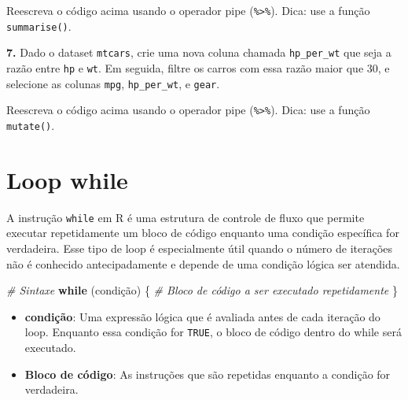 \documentclass[
]{book}
\newenvironment{Shaded}{\begin{snugshade}}{\end{snugshade}}
\newcommand{\CommentTok}[1]{\textcolor[rgb]{0.56,0.35,0.01}{\textit{#1}}}
\newcommand{\ControlFlowTok}[1]{\textcolor[rgb]{0.13,0.29,0.53}{\textbf{#1}}}
\newcommand{\DecValTok}[1]{\textcolor[rgb]{0.00,0.00,0.81}{#1}}
\newcommand{\FunctionTok}[1]{\textcolor[rgb]{0.13,0.29,0.53}{\textbf{#1}}}
\newcommand{\NormalTok}[1]{#1}
\newcommand{\OtherTok}[1]{\textcolor[rgb]{0.56,0.35,0.01}{#1}}
\newcommand{\SpecialCharTok}[1]{\textcolor[rgb]{0.81,0.36,0.00}{\textbf{#1}}}
\begin{document}
Reescreva o código acima usando o operador pipe (\texttt{\%\textgreater{}\%}). Dica: use a função \texttt{summarise()}.

\textbf{7.} Dado o dataset \texttt{mtcars}, crie uma nova coluna chamada \texttt{hp\_per\_wt} que seja a razão entre \texttt{hp} e \texttt{wt}. Em seguida, filtre os carros com essa razão maior que 30, e selecione as colunas \texttt{mpg}, \texttt{hp\_per\_wt}, e \texttt{gear}.

\begin{Shaded}
\end{Shaded}

Reescreva o código acima usando o operador pipe (\texttt{\%\textgreater{}\%}). Dica: use a função \texttt{mutate()}.

\chapter{Loop while}\label{loop-while}

A instrução \texttt{while} em R é uma estrutura de controle de fluxo que
permite executar repetidamente um bloco de código enquanto uma condição
específica for verdadeira. Esse tipo de loop é especialmente útil quando
o número de iterações não é conhecido antecipadamente e depende de uma
condição lógica ser atendida.

\begin{Shaded}
\begin{Highlighting}[]
\CommentTok{\# Sintaxe}
\ControlFlowTok{while}\NormalTok{ (condição) \{}
  \CommentTok{\# Bloco de código a ser executado repetidamente}
\NormalTok{\}}
\end{Highlighting}
\end{Shaded}

\begin{itemize}
\item
  \textbf{condição}: Uma expressão lógica que é avaliada antes de cada
  iteração do loop. Enquanto essa condição for \texttt{TRUE}, o bloco de
  código dentro do while será executado.
\item
  \textbf{Bloco de código}: As instruções que são repetidas enquanto a
  condição for verdadeira.
\end{itemize}
\end{document}
